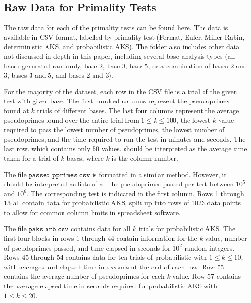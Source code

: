\documentclass{article}
\begin{document}
\appendix
\begin{appendices}
\section{Raw Data for Primality Tests} \label{appendix:data}

The raw data for each of the primality tests can be found \href{https://github.com/kewbish/srs/tree/master/dataset}{here}.
The data is available in CSV format, labelled by primality test (Fermat, Euler, Miller-Rabin, deterministic AKS, and probabilistic AKS). The folder also includes other data not discussed in-depth in this paper, including several base analysis types (all bases generated randomly, base 2, base 3, base 5, or a combination of bases 2 and 3, bases 3 and 5, and bases 2 and 3).

For the majority of the dataset, each row in the CSV file is a trial of the given test with given base. The first hundred columns represent the pseudoprimes found at $k$ trials of different bases. The last four columns represent the average pseudoprimes found over the entire trial from $1 \leq k \leq 100$, the lowest $k$ value required to pass the lowest number of pseudoprimes, the lowest number of pseudoprimes, and the time required to run the test in minutes and seconds. 
The last row, which contains only 50 values, should be interpreted as the average time taken for a trial of $k$ bases, where $k$ is the column number.

The file $\texttt{passed\_pprimes.csv}$ is formatted in a similar method. However, it should be interpreted as lists of all the pseudoprimes passed per test between $10^5$ and $10^6$. The corresponding test is indicated in the first column. Rows 1 through 13 all contain data for probabilistic AKS, split up into rows of 1023 data points to allow for common column limits in spreadsheet software.

The file $\texttt{paks\_arb.csv}$ contains data for all $k$ trials for probabilistic AKS. The first four blocks in rows 1 through 44 contain information for the $k$ value, number of pseudoprimes passed, and time elapsed in seconds for $10^2$ random integers. Rows 45 through 54 contains data for ten trials of probabilistic with $1 \leq k \leq 10$, with averages and elapsed time in seconds at the end of each row. Row 55 contains the average number of pseudoprimes for each $k$ value. Row 57 contains the average elapsed time in seconds required for probabilistic AKS with $1 \leq k \leq 20$.


\end{appendices}
\end{document}
